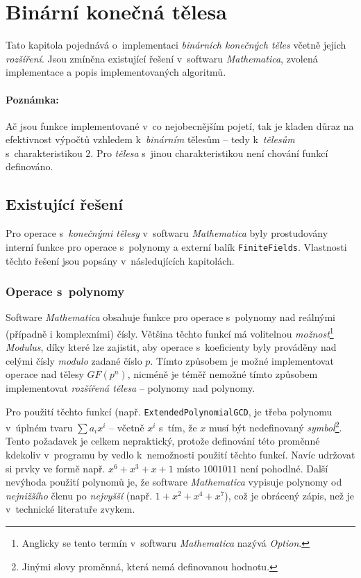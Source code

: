 \documentclass[thesis=M,czech,hidelinks]{FITthesis}[2012/06/26]
\newcommand{\0}{{\textcolor[gray]{0.80}{0}}}
\begin{document}
\section{Binární konečná tělesa}

Tato kapitola pojednává o~implementaci \emph{binárních konečných těles} včetně
jejich \emph{rozšíření}. Jsou zmíněna existující řešení v~softwaru
\emph{Mathematica}, zvolená implementace a popis implementovaných algoritmů.

\paragraph{Poznámka:} Ač jsou funkce implementované v~co nejobecnějším pojetí,
tak je kladen důraz na efektivnost výpočtů vzhledem k~\emph{binárním} tělesům --
tedy k~\emph{tělesům} s~charakteristikou $2$. Pro \emph{tělesa} s~jinou
charakteristikou není chování funkcí definováno.

\subsection{Existující řešení}

Pro operace s~\emph{konečnými tělesy} v~softwaru \emph{Mathematica} byly
prostudovány interní funkce pro operace s~polynomy a externí balík
\texttt{FiniteFields}. Vlastnosti těchto řešení jsou popsány v~následujících
kapitolách.

\subsubsection{Operace s~polynomy}

Software \emph{Mathematica} obsahuje funkce pro operace s~polynomy nad reálnými
(případně i komplexními) čísly. Většina těchto funkcí má volitelnou
\emph{možnost}\footnote{
    Anglicky se tento termín v~softwaru \emph{Mathematica} nazývá \emph{Option}.
} \emph{Modulus}, díky které lze zajistit, aby operace s~koeficienty byly
prováděny nad celými čísly \emph{modulo} zadané číslo $p$. Tímto způsobem je
možné implementovat operace nad tělesy $GF(p^n)$, nicméně je téměř nemožné tímto
způsobem implementovat \emph{rozšířená tělesa} -- polynomy nad polynomy.

Pro použití těchto funkcí (např. \texttt{ExtendedPolynomialGCD}, je třeba
polynomu v~úplném tvaru $\sum a_i x^i$ -- včetně $x^i$ s~tím, že $x$ musí být
nedefinovaný \emph{symbol}\footnote{
    Jinými slovy proměnná, která nemá definovanou hodnotu.
}. Tento požadavek je celkem nepraktický, protože definování této proměnné
kdekoliv v~programu by vedlo k~nemožnosti použití těchto funkcí. Navíc udržovat
si prvky ve formě např. $x^6 + x^3 + x + 1$ místo $1001011$ není pohodlné.
Další nevýhoda použití polynomů je, že software \emph{Mathematica} vypisuje
polynomy od \emph{nejnižšího} členu po \emph{nejvyšší} (např. $1+x^2+x^4+x^7$),
což je obrácený zápis, než je v~technické literatuře zvykem.
\end{document}
